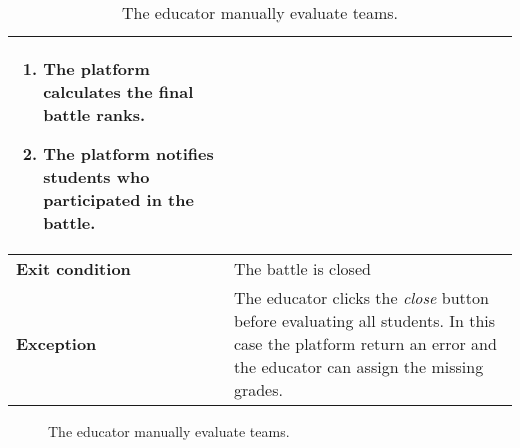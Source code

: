 \begin{enumerate}[label=\textbf{UC\arabic*}:,leftmargin=1.3cm]
\begin{table}[H]
\begin{tabular}{|l|p{11.9cm}|}
\begin{enumerate}[label=\arabic*.]
                      \item The platform calculates the final battle ranks.
                      \item The platform notifies students who participated in the battle.
                  \end{enumerate}                 \\\hline
                  \textbf{Exit condition}  & The battle is closed                                                        \\\hline
                  \textbf{Exception}       & The educator clicks the \emph{close} button before evaluating all students.
                  In this case the platform return an error and the educator can assign the missing grades.              \\\hline
              \end{tabular}
              \caption{The educator manually evaluate teams.}
              \label{table:The educator manually evaluate teams}
          \end{table}

          \begin{figure}[H]
              \centering
              \caption{The educator manually evaluate teams.}
              \label{fig:The educator manually evaluate teams}
          \end{figure}

          \pagebreak


\end{enumerate}

